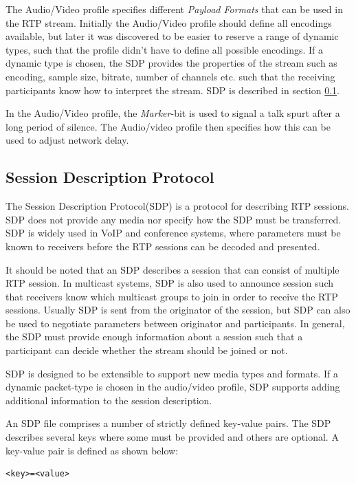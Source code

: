 The Audio/Video profile specifies different \textit{Payload Formats} that can be used in the RTP stream. Initially the Audio/Video profile should define all encodings available, but later it was discovered to be easier to reserve a range of dynamic types, such that the profile didn't have to define all possible encodings. If a dynamic type is chosen, the SDP provides the properties of the stream such as encoding, sample size, bitrate, number of channels etc. such that the receiving participants know how to interpret the stream.
SDP is described in section \ref{sec:design:sdp}.

In the Audio/Video profile, the \textit{Marker}-bit is used to signal a talk spurt after a long period of silence. The Audio/video profile then specifies how this can be used to adjust network delay.

\subsection{Session Description Protocol} \label{sec:design:sdp}
The Session Description Protocol(SDP) is a protocol for describing RTP sessions.
SDP does not provide any media nor specify how the SDP must be transferred.
SDP is widely used in VoIP and conference systems, where parameters must be known to receivers before the RTP sessions can be decoded and presented.

It should be noted that an SDP describes a session that can consist of multiple RTP session.
In multicast systems, SDP is also used to announce session such that receivers know which multicast groups to join in order to receive the RTP sessions. Usually SDP is sent from the originator of the session, but SDP can also be used to negotiate parameters between originator and participants.
In general, the SDP must provide enough information about a session such that a participant can decide whether the stream should be joined or not.

SDP is designed to be extensible to support new media types and formats.
If a dynamic packet-type is chosen in the audio/video profile, SDP supports adding additional information to the session description. 

An SDP file comprises a number of strictly defined key-value pairs.
The SDP describes several keys where some must be provided and others are optional.
A key-value pair is defined as shown below:
\begin{verbatim}
<key>=<value>
\end{verbatim}

